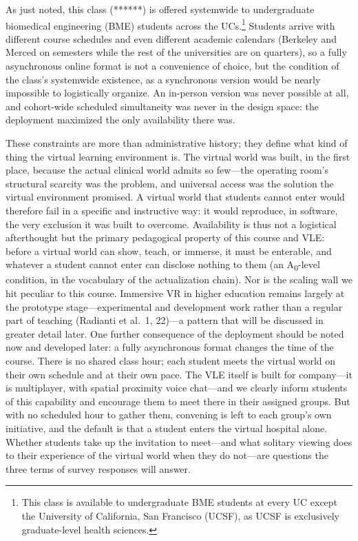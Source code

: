 As just noted, this class (******) is offered systemwide to undergraduate
biomedical engineering (BME) students across the UCs.\footnote{This class is
available to undergraduate BME students at every UC except the University of
California, San Francisco (UCSF), as UCSF is exclusively graduate-level health
sciences.} Students arrive with different course schedules and even different
academic calendars (Berkeley and Merced on semesters while the rest of the
universities are on quarters), so a fully asynchronous online format is not a
convenience of choice, but the condition of the class's systemwide existence, as
a synchronous version would be nearly impossible to logistically organize. An
in-person version was never possible at all, and cohort-wide scheduled
simultaneity was never in the design space: the deployment maximized the only
availability there was.

These constraints are more than administrative history; they define what kind of
thing the virtual learning environment is. The virtual world was built, in the
first place, because the actual clinical world admits so few---the operating
room's structural scarcity was the problem, and universal access was the
solution the virtual environment promised. A virtual world that students cannot
enter would therefore fail in a specific and instructive way: it would
reproduce, in software, the very exclusion it was built to overcome.
Availability is thus not a logistical afterthought but the primary pedagogical
property of this course and VLE: before a virtual world can show, teach, or
immerse, it must be enterable, and whatever a student cannot enter can disclose
nothing to them (an A\textsubscript{0}-level condition, in the vocabulary of the
actualization chain). Nor is the scaling wall we hit peculiar to this course.
Immersive VR in higher education remains largely at the prototype
stage---experimental and development work rather than a regular part of teaching
(Radianti et al.\ 1, 22)---a pattern that will be discussed in greater detail
later. One further consequence of the deployment should be noted now and
developed later: a fully asynchronous format changes the time of the course.
There is no shared class hour; each student meets the virtual world on their own
schedule and at their own pace. The VLE itself is built for company---it is
multiplayer, with spatial proximity voice chat---and we clearly inform students
of this capability and encourage them to meet there in their assigned groups.
But with no scheduled hour to gather them, convening is left to each group's own
initiative, and the default is that a student enters the virtual hospital alone.
Whether students take up the invitation to meet---and what solitary viewing does
to their experience of the virtual world when they do not---are questions the
three terms of survey responses will answer.


